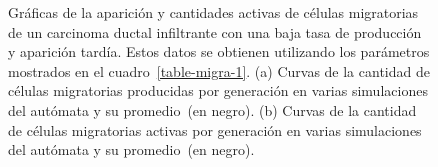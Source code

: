 \begin{figure}[p]
\begin{center}
\vspace*{-0.25cm}
\end{center}\vspace*{-0.6cm}
\caption[Gr\'aficas de la aparici\'on y cantidades activas de c\'elulas migratorias de un carcinoma ductal infiltrante con una baja tasa de producci\'on y aparici\'on tard\'ia]{Gr\'aficas de la aparici\'on y cantidades activas de c\'elulas migratorias de un carcinoma ductal infiltrante con una baja tasa de producci\'on y aparici\'on tard\'ia. Estos datos se obtienen utilizando los par\'ametros mostrados en el cuadro~\ref{table-migra-1}. (a) Curvas de la cantidad de c\'elulas migratorias producidas por generaci\'on en varias simulaciones del aut\'omata y su promedio~(en negro). (b) Curvas de la cantidad de c\'elulas migratorias activas por generaci\'on en varias simulaciones del aut\'omata y su promedio~(en negro).}
\label{graph-migra-app-1}
\end{figure}

